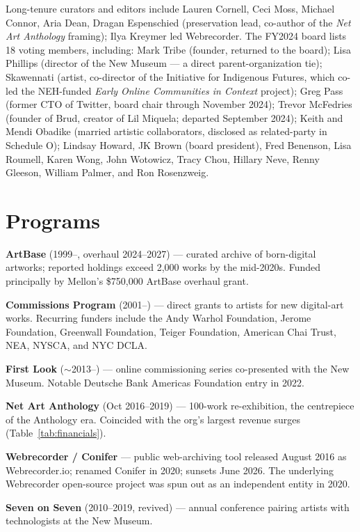 \documentclass[10pt,letterpaper,twocolumn]{article}
\begin{document}
Long-tenure curators and editors include Lauren Cornell, Ceci Moss, Michael Connor, Aria Dean, Dragan Espenschied (preservation lead, co-author of the \emph{Net Art Anthology} framing); Ilya Kreymer led Webrecorder. The FY2024 board lists 18 voting members, including: Mark Tribe (founder, returned to the board); Lisa Phillips (director of the New Museum --- a direct parent-organization tie); Skawennati (artist, co-director of the Initiative for Indigenous Futures, which co-led the NEH-funded \emph{Early Online Communities in Context} project); Greg Pass (former CTO of Twitter, board chair through November 2024); Trevor McFedries (founder of Brud, creator of Lil Miquela; departed September 2024); Keith and Mendi Obadike (married artistic collaborators, disclosed as related-party in Schedule O); Lindsay Howard, JK Brown (board president), Fred Benenson, Lisa Roumell, Karen Wong, John Wotowicz, Tracy Chou, Hillary Neve, Renny Gleeson, William Palmer, and Ron Rosenzweig.

\section{Programs}

\textbf{ArtBase} (1999--, overhaul 2024--2027) --- curated archive of born-digital artworks; reported holdings exceed 2{,}000 works by the mid-2020s. Funded principally by Mellon's \$750{,}000 ArtBase overhaul grant.

\textbf{Commissions Program} (2001--) --- direct grants to artists for new digital-art works. Recurring funders include the Andy Warhol Foundation, Jerome Foundation, Greenwall Foundation, Teiger Foundation, American Chai Trust, NEA, NYSCA, and NYC DCLA.

\textbf{First Look} ($\sim$2013--) --- online commissioning series co-presented with the New Museum. Notable Deutsche Bank Americas Foundation entry in 2022.

\textbf{Net Art Anthology} (Oct 2016--2019) --- 100-work re-exhibition, the centrepiece of the Anthology era. Coincided with the org's largest revenue surges (Table~\ref{tab:financials}).

\textbf{Webrecorder / Conifer} --- public web-archiving tool released August 2016 as Webrecorder.io; renamed Conifer in 2020; sunsets June 2026. The underlying Webrecorder open-source project was spun out as an independent entity in 2020.

\textbf{Seven on Seven} (2010--2019, revived) --- annual conference pairing artists with technologists at the New Museum.
\end{document}
